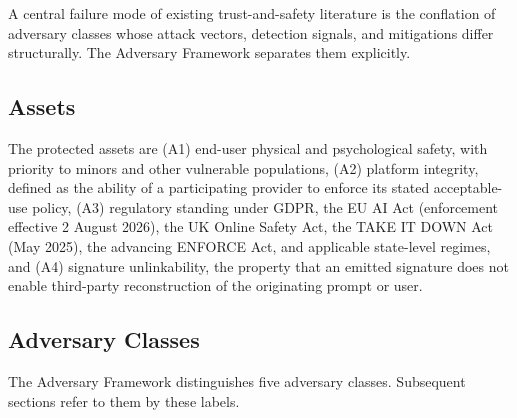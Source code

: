 \documentclass[11pt]{article}
\begin{document}
A central failure mode of existing trust-and-safety literature is the conflation of adversary classes whose attack vectors, detection signals, and mitigations differ structurally. The Adversary Framework separates them explicitly.

\subsection{Assets}
The protected assets are (A1) end-user physical and psychological safety, with priority to minors and other vulnerable populations, (A2) platform integrity, defined as the ability of a participating provider to enforce its stated acceptable-use policy, (A3) regulatory standing under GDPR, the EU AI Act (enforcement effective 2 August 2026), the UK Online Safety Act, the TAKE IT DOWN Act (May 2025), the advancing ENFORCE Act, and applicable state-level regimes, and (A4) signature unlinkability, the property that an emitted signature does not enable third-party reconstruction of the originating prompt or user.

\subsection{Adversary Classes}
The Adversary Framework distinguishes five adversary classes. Subsequent sections refer to them by these labels.
\end{document}
